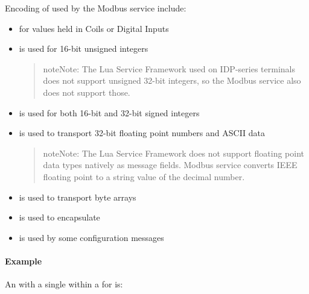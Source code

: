 \documentclass[letterpaper,10pt,english]{sphinxmanual}
\begin{document}
Encoding of  used by the Modbus service  include:
\begin{itemize}
\item {} 
 for values held in Coils or Digital Inputs

\item {} 
 is used for 16-bit unsigned integers
\begin{quote}

\begin{sphinxadmonition}{note}{Note:}
The Lua Service Framework used on IDP-series terminals does not support unsigned 32-bit integers, so the Modbus service also does not support those.
\end{sphinxadmonition}
\end{quote}

\item {} 
 is used for both 16-bit and 32-bit signed integers

\item {} 
 is used to transport 32-bit floating point numbers and ASCII data
\begin{quote}

\begin{sphinxadmonition}{note}{Note:}
The Lua Service Framework does not support floating point data types natively as message fields.
Modbus service converts IEEE floating point to a string value of the decimal number.
\end{sphinxadmonition}
\end{quote}

\item {} 
 is used to transport  byte arrays

\item {} 
 is used to encapsulate 

\item {} 
 is used by some configuration messages

\end{itemize}


\paragraph{Example}
\label{\detokenize{otaapi:example}}
An  with a single   within a  for {\hyperref[\detokenize{otaapi:periodicreport}]{}} is:
\end{document}
